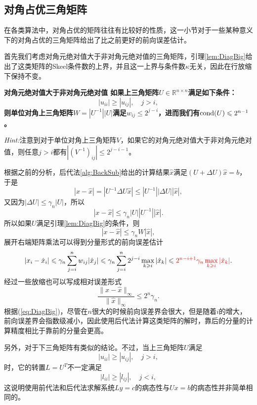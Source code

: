 \documentclass[a4paper,10pt]{ctexart}
\begin{document}
\subsection{对角占优三角矩阵}
在各类算法中，对角占优的矩阵往往有比较好的性质，这一小节对于一些某种意义下的对角占优的三角矩阵给出了比之前更好的前向误差估计。

首先我们考虑对角元绝对值大于非对角元绝对值的三角矩阵，引理\ref{lem:DiagBig}给出了这类矩阵的Skeel条件数的上界，并且这一上界与条件数$ \kappa $无关，因此在行放缩下保持不变。
\begin{lemma}\label{lem:DiagBig}\bf{\textup{对角元绝对值大于非对角元绝对值}}
    如果上三角矩阵$ U\in \mathbb{R}^{n\times n} $满足如下条件：
    \begin{equation}
        |u_{ii}|\geqslant |u_{ij}|,\quad j>i,
    \end{equation}
    则单位对角上三角矩阵$ W = |U^{-1}| |U| $满足$ w_{ij}\leqslant 2^{j-i} $，进而我们有$ {\rm cond}(U) \leqslant 2^{n-1} $。
\end{lemma}
\noindent \emph{Hint:}注意到对于单位对角上三角矩阵$ V $，如果它的对角元绝对值大于非对角元绝对值，则任意$ j>i $都有$ |(V^{-1})_{ij}|\leqslant 2^{j-i-1} $。

根据之前的分析，后代法\ref{alg:BackSub}给出的计算结果$ \hat{x} $满足$ (U+\Delta U)\hat{x} = b $，于是
\[
    |x - \hat{x}| = |U^{-1} \Delta U \hat{x}|\leqslant |U^{-1}| |\Delta U| |\hat{x}|,
\]
又因为$ |\Delta U|\leqslant \gamma_n |U| $，所以
\[
    |x - \hat{x}| \leqslant \gamma_n |U| |U^{-1}| |\hat{x}|.
\]
所以如果$ U $满足引理\ref{lem:DiagBig}的条件，则
\[
    |x - \hat{x}| \leqslant \gamma_n W |\hat{x}|,
\]
展开右端矩阵乘法可以得到分量形式的前向误差估计
\begin{equation}\label{eq:DiagBig}
    |x_i - \hat{x}_i| \leqslant \gamma_n \sum_{j=i}^{n} w_{ij} |\hat{x}_j| \leqslant \gamma_n \sum_{j=i}^{n} 2^{j-i} \max_{k\geqslant i}|\hat{x}_k| \leqslant \textcolor{red}{2^{n-i+1}\gamma_n \max_{k\geqslant i}|\hat{x}_k|}.
\end{equation}
经过一些放缩也可以写成相对误差形式
\begin{equation}
    \frac{\| x - \hat{x} \|_\infty}{\| \hat{x} \|_\infty} \leqslant 2^{n} \gamma_n.
\end{equation}
根据(\ref{eq:DiagBig})，尽管在$ n $很大的时候前向误差界会很大，但是随着$ i $的增大，前向误差界会指数级减小，因此使用后代法计算这类矩阵的解时，靠后的分量的计算精度相比于靠前的分量会更高。

另外，对于下三角矩阵有类似的结论。不过，当上三角矩阵$ U $满足
\[
    |u_{ii}|\geqslant |u_{ij}|, \quad j>i,
\]
时，它的转置$ L = U^T $不一定满足
\[
    |l_{ii}|\geqslant |l_{ij}|, \quad j<i,
\]
这说明使用前代法和后代法求解系统$ Ly = c $的病态性与$ Ux = b $的病态性并非简单相同的。
\end{document}
